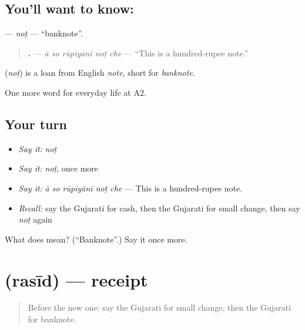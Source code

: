 \subsection*{You'll want to know: }
\textbf{} — \emph{noṭ} — \textquotedblleft{}banknote\textquotedblright{}.

\begin{quote}
\textbf{    .} — \emph{ā so rūpiyānī noṭ che} — \textquotedblleft{}This is a hundred-rupee note.\textquotedblright{}
\end{quote}

\begin{cousinweb}
\textbf{} (\emph{noṭ}) is a loan from English \emph{note}, short for \emph{banknote}.
\end{cousinweb}

\begin{grammarlens}[title={What you've built}]
One more word for everyday life at A2.
\end{grammarlens}

\subsection*{Your turn}
\begin{itemize}
\raggedright
  \item \emph{Say it:} \emph{noṭ}
  \item \emph{Say it:} \emph{noṭ}, once more
  \item \emph{Say it:} \emph{ā so rūpiyānī noṭ che} — This is a hundred-rupee note.
  \item \emph{Recall:} say the Gujarati for cash, then the Gujarati for small change, then say \emph{noṭ} again
\end{itemize}

\begin{tcolorbox}[breakable,colback=teal!4,colframe=teal!35!black,title={Before you move on}]
What does  mean? (\textquotedblleft{}Banknote\textquotedblright{}.) Say it once more.
\end{tcolorbox}
\section[\texorpdfstring{\gu{રસીદ} (rasīd)}{રસીદ (rasīd)}]{ (rasīd) — receipt}

\label{lesson:GU-C186-rasid}



\begin{quote}
Before the new one: say the Gujarati for small change, then the Gujarati for banknote.
\end{quote}

